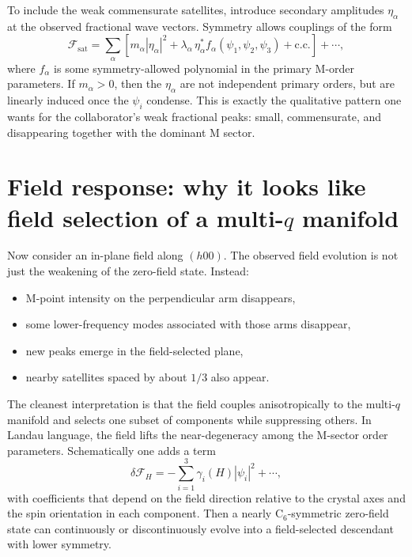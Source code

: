\documentclass[11pt]{article}
\begin{document}
To include the weak commensurate satellites, introduce secondary amplitudes \(\eta_\alpha\) at the observed fractional wave vectors. Symmetry allows couplings of the form
\begin{equation}
\mathcal{F}_{\mathrm{sat}} = \sum_\alpha \left[m_\alpha |\eta_\alpha|^2 + \lambda_\alpha\, \eta_\alpha^* f_\alpha(\psi_1,\psi_2,\psi_3) + \text{c.c.}\right] + \cdots,
\end{equation}
where \(f_\alpha\) is some symmetry-allowed polynomial in the primary M-order parameters. If \(m_\alpha>0\), then the \(\eta_\alpha\) are not independent primary orders, but are linearly induced once the \(\psi_i\) condense. This is exactly the qualitative pattern one wants for the collaborator's weak fractional peaks: small, commensurate, and disappearing together with the dominant M sector.

\section{Field response: why it looks like field selection of a multi-$q$ manifold}

Now consider an in-plane field along \((h00)\). The observed field evolution is not just the weakening of the zero-field state. Instead:
\begin{itemize}[leftmargin=2em,itemsep=0.35em]
    \item M-point intensity on the perpendicular arm disappears,
    \item some lower-frequency modes associated with those arms disappear,
    \item new peaks emerge in the field-selected plane,
    \item nearby satellites spaced by about \(1/3\) also appear.
\end{itemize}

The cleanest interpretation is that the field couples anisotropically to the multi-$q$ manifold and selects one subset of components while suppressing others. In Landau language, the field lifts the near-degeneracy among the M-sector order parameters. Schematically one adds a term
\begin{equation}
\delta \mathcal{F}_H = - \sum_{i=1}^3 \gamma_i(H) |\psi_i|^2 + \cdots,
\end{equation}
with coefficients that depend on the field direction relative to the crystal axes and the spin orientation in each component. Then a nearly C$_6$-symmetric zero-field state can continuously or discontinuously evolve into a field-selected descendant with lower symmetry.
\end{document}
